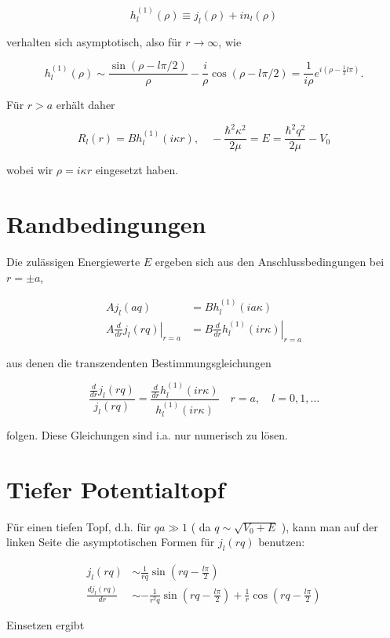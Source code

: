 \documentclass[10pt, letterpaper]{article}
\begin{document}
$$
h_{l}^{(1)}(\rho) \equiv j_{l}(\rho)+i n_{l}(\rho)
$$

verhalten sich asymptotisch, also für $r \rightarrow \infty$, wie

$$
h_{l}^{(1)}(\rho) \sim \frac{\sin (\rho-l \pi / 2)}{\rho}-\frac{i}{\rho} \cos (\rho-l \pi / 2)=\frac{1}{i \rho} e^{i\left(\rho-\frac{1}{2} l \pi\right)} .
$$

Für $r>a$ erhält daher

$$
R_{l}(r)=B h_{l}^{(1)}(i \kappa r), \quad-\frac{\hbar^{2} \kappa^{2}}{2 \mu}=E=\frac{\hbar^{2} q^{2}}{2 \mu}-V_{0}
$$

wobei wir $\rho=i \kappa r$ eingesetzt haben.

\section*{Randbedingungen}
Die zulässigen Energiewerte $E$ ergeben sich aus den Anschlussbedingungen bei $r= \pm a$,

$$
\begin{aligned}
A j_{l}(a q) & =B h_{l}^{(1)}(i a \kappa) \\
\left.A \frac{d}{d r} j_{l}(r q)\right|_{r=a} & =\left.B \frac{d}{d r} h_{l}^{(1)}(i r \kappa)\right|_{r=a}
\end{aligned}
$$

aus denen die transzendenten Bestimmungsgleichungen

$$
\frac{\frac{d}{d r} j_{l}(r q)}{j_{l}(r q)}=\frac{\frac{d}{d r} h_{l}^{(1)}(i r \kappa)}{h_{l}^{(1)}(i r \kappa)} \quad r=a, \quad l=0,1, \ldots
$$

folgen. Diese Gleichungen sind i.a. nur numerisch zu lösen.

\section*{Tiefer Potentialtopf}
Für einen tiefen Topf, d.h. für $q a \gg 1$ ( da $q \sim \sqrt{V_{0}+E}$ ), kann man auf der linken Seite die asymptotischen Formen für $j_{l}(r q)$ benutzen:

$$
\begin{aligned}
j_{l}(r q) & \sim \frac{1}{r q} \sin \left(r q-\frac{l \pi}{2}\right) \\
\frac{d j_{l}(r q)}{d r} & \sim-\frac{1}{r^{2} q} \sin \left(r q-\frac{l \pi}{2}\right)+\frac{1}{r} \cos \left(r q-\frac{l \pi}{2}\right)
\end{aligned}
$$

Einsetzen ergibt
\end{document}
